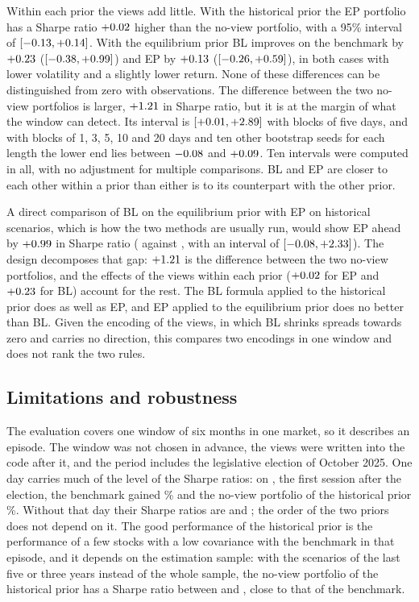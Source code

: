 \documentclass[11pt]{article}
\begin{document}
Within each prior the views add little. With the historical prior the EP
portfolio has a Sharpe ratio $+0.02$ higher than the no-view
portfolio, with a 95\% interval of $[-0.13, +0.14]$. With the
equilibrium prior BL improves on the benchmark by $+0.23$
($[-0.38, +0.99]$) and EP by $+0.13$
($[-0.26, +0.59]$), in both cases with lower volatility and
a slightly lower return. None of these differences can be distinguished
from zero with \nDays{} observations. The difference between the two
no-view portfolios is larger, $+1.21$ in Sharpe ratio, but it is
at the margin of what the window can detect. Its interval is
$[+0.01, +2.89]$ with blocks of five days, and with blocks
of 1, 3, 5, 10 and 20 days and ten other bootstrap seeds for each length
the lower end lies between
$-0.08$ and $+0.09$. Ten intervals were computed in
all, with no adjustment for multiple comparisons. BL and EP are closer to
each other within a prior than either is to its counterpart with the other
prior.

A direct comparison of BL on the equilibrium prior with EP on historical
scenarios, which is how the two methods are usually run, would show EP
ahead by $+0.99$ in Sharpe ratio (\nShEP{} against \nShBL, with
an interval of $[-0.08, +2.33]$). The design decomposes
that gap: $+1.21$ is the difference between the two no-view
portfolios, and the effects of the views within each prior
($+0.02$ for EP and $+0.23$ for BL) account for the rest.
The BL formula applied to the historical prior does as
well as EP, and EP applied to the equilibrium prior does no better than
BL. Given the encoding of the views, in which BL shrinks spreads towards
zero and carries no direction, this compares two encodings in one window
and does not rank the two rules.

\subsection{Limitations and robustness}\label{sec:limitations}

The evaluation covers one window of six months in one market, so it
describes an episode. The window was not chosen in advance, the views were
written into the code after it, and the period includes the legislative
election of October 2025. One day carries much of the level of the Sharpe
ratios: on \nExtDay, the first session after the election, the benchmark
gained \nExtBench\% and the no-view portfolio of the historical prior
\nExtMVhist\%. Without that day their Sharpe ratios are \nShBenchEx{} and
\nShMVhistEx; the order of the two priors does not depend on it. The good performance of the historical prior is
the performance of a few stocks with a low covariance with the benchmark
in that episode, and it depends on the estimation sample: with the
scenarios of the last five or three years instead of the whole sample, the
no-view portfolio of the historical prior has a Sharpe ratio between
\nShWinNVmin{} and \nShWinNVmax, close to that of the benchmark.
\end{document}
